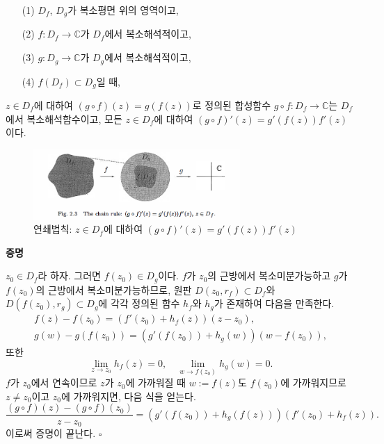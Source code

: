 \begin{saltprop}[연쇄법칙]{}{} \label{prop-2-2} 
\begin{itemize}
\item[(1)] $D_f$, $D_g$가 복소평면 위의 영역이고,
\item[(2)] $f:D_f \to \mathbb C$가 $D_f$에서 복소해석적이고,
\item[(3)] $g:D_g \to \mathbb C$가 $D_g$에서 복소해석적이고,
\item[(4)] $f(D_f) \subset D_g$일 때,
\end{itemize}
$z\in D_f$에 대하여 $(g\circ f)(z) = g(f(z))$로 정의된
합성함수 $g\circ f : D_f \to \mathbb C$는 $D_f$에서
복소해석함수이고, 
모든 $z\in D_f$에 대하여 $(g\circ f)'(z) = g'(f(z))f'(z)$이다.
\end{saltprop}

\begin{figure}[!h]
\begin{center}
\includegraphics[width=0.7\textwidth]{./SaltChapter/fig-2-3}
\end{center}
\caption{연쇄법칙: $z\in D_f$에 대하여 $(g\circ f)'(z) = g'(f(z))f'(z)$}
\label{fig-2-3}
\end{figure}

{\bf 증명}

$z_0\in D_f$라 하자. 그러면 $f(z_0)\in D_g$이다.
$f$가 $z_0$의 근방에서 복소미분가능하고
$g$가 $f(z_0)$의 근방에서 복소미분가능하므로,
원판 $D(z_0, r_f)\subset D_f$와 $D(f(z_0), r_g) \subset D_g$에 각각 정의된
함수 $h_f$와 $h_g$가 존재하여 다음을 만족한다.
\begin{gather*}
f(z) - f(z_0) = (f'(z_0)+h_f(z))(z-z_0), \\
g(w) - g(f(z_0)) = (g'(f(z_0)) + h_g(w))(w-f(z_0)),
\end{gather*}
또한
\[
\lim_{z\to z_0} h_f(z)=0, \quad
\lim_{w\to f(z_0)} h_g(w)=0.
\]
$f$가 $z_0$에서 연속이므로
$z$가 $z_0$에 가까워질 때 $w:=f(z)$도 $f(z_0)$에 가까워지므로
$z\ne z_0$이고 $z_0$에 가까워지면, 다음 식을 얻는다.
\[
\dfrac{(g\circ f)(z) - (g\circ f)(z_0)}{z-z_0} 
= (g'(f(z_0)) + h_g(f(z)))(f'(z_0) + h_f(z)).
\]
이로써 증명이 끝난다. \hfill $\square$

